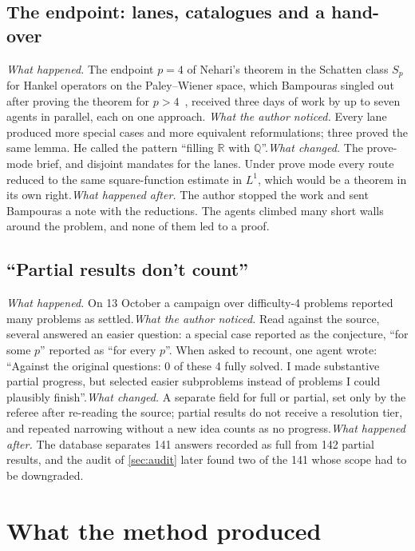 \documentclass[11pt]{amsart}
\newcommand*{\sectionbreak}{\clearpage} %
\begin{document}
\subsection*{The endpoint: lanes, catalogues and a hand-over}
\emph{What happened.} The endpoint $p=4$ of Nehari's theorem in the Schatten
class $S_p$ for Hankel operators on the Paley--Wiener space, which Bampouras
singled out after proving the theorem for $p>4$~\cite{bampouras}, received
three days of work by up to seven agents in parallel, each on one approach.\@
\emph{What the author noticed.} Every lane produced more special cases and more
equivalent reformulations; three proved the same lemma. He called the pattern
``filling $\mathbb R$ with $\mathbb Q$''.\@ \emph{What changed.} The prove-mode
brief, and disjoint mandates for the lanes. Under prove mode every route
reduced to the same square-function estimate in $L^1$, which would be a theorem
in its own right.\@ \emph{What happened after.} The author stopped the work and
sent Bampouras a note with the reductions. The agents climbed many short walls
around the problem, and none of them led to a proof.

\subsection*{``Partial results don't count''}
\emph{What happened.} On 13 October a campaign over difficulty-4 problems
reported many problems as settled.\@ \emph{What the author noticed.} Read
against the source, several answered an easier question: a special case
reported as the conjecture, ``for some $p$'' reported as ``for every $p$''.
When asked to recount, one agent wrote: ``Against the original questions: 0 of
these 4 fully solved. I made substantive partial progress, but selected easier
subproblems instead of problems I could plausibly finish''.\@ \emph{What
changed.} A separate field for full or partial, set only by the referee after
re-reading the source; partial results do not receive a resolution tier, and
repeated narrowing without a new idea counts as no progress.\@ \emph{What
happened after.} The database separates 141 answers recorded as full from 142
partial results, and the audit of \cref{sec:audit} later found two of the 141
whose scope had to be downgraded.

\sectionbreak
\section{What the method produced}\label{sec:produced}
\end{document}
